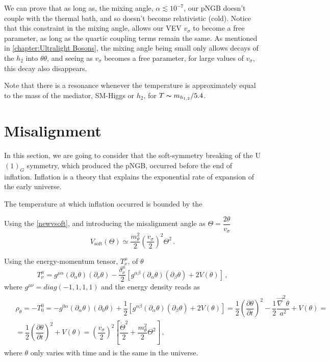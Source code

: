 We can prove that as long as, the mixing angle, $\alpha\lesssim10^{-7}$, our pNGB doesn't couple with the thermal bath, and so doesn't become relativistic (cold). Notice that this constraint in the mixing angle, allows our VEV $v_\sigma$ to become a free parameter, as long as the quartic coupling terms remain the same. As mentioned in \autoref{chapter:Ultralight Bosons}, the mixing angle being small only allows decays of the $h_2$ into $\theta\theta$, and seeing as $v_\sigma$ becomes a free parameter, for large values of $v_\sigma$, this decay also disappears.

Note that there is a resonance whenever the temperature is approximately equal to the mass of the mediator, SM-Higgs or $h_2$, for $T\thicksim m_{h_{1,2}}/5.4$\cite{kolb}.

\section{Misalignment}
 
In this section, we are going to consider that the soft-symmetry breaking of the U$(1)_G$ symmetry, which produced the pNGB, occurred before the end of inflation. Inflation is a theory that explains the exponential rate of expansion of the early universe.

The temperature at which inflation occurred is bounded by the 

Using the \autoref{newvsoft}, and introducing the misalignment angle as $\Theta = \dfrac{2\theta}{v_\sigma}$
\begin{equation}
    V_{\textrm{soft}}(\Theta)\simeq \frac{m_\theta^2}{2}\left(\frac{v_\sigma}{2}\right)^2\Theta^2\,.
\end{equation}

Using the energy-momentum tensor, $T^{\mu}_\nu$, of $\theta$ 
\begin{equation}
    T^\mu_\nu=g^{\mu\alpha}(\partial_\alpha\theta)(\partial_\nu\theta)-\frac{\delta^\mu_\nu}{2}[g^{\alpha\beta}(\partial_\alpha\theta)(\partial_\beta\theta)+2V(\theta)]\,,
\end{equation}
where $g^{\mu\nu}=diag(-1,1,1,1)$ and the energy density reads as \cite{Marsh_2016}\cite{kolb}
\begin{align}
\label{densityenergy}
\begin{array}{ccc}
    &\rho_\theta=-T^0_0=-g^{0\alpha}(\partial_\alpha\theta)(\partial_0\theta)+\dfrac{1}{2}[g^{\alpha\beta}(\partial_\alpha\theta)(\partial_\beta\theta)+2V(\theta)]=\dfrac{1}{2}\left(\dfrac{\partial\theta}{\partial t}\right)^2-\dfrac{1}{2}\dfrac{\vec{\nabla}^2\theta}{a^2}+V(\theta)=\\ [5pt]
    &=\dfrac{1}{2}\left(\dfrac{\partial\theta}{\partial t}\right)^2+V(\theta)=\left(\dfrac{v_\sigma}{2}\right)^2\left[\dfrac{\dot{\Theta}^2}{2}+\dfrac{m_\theta^2}{2}\Theta^2\right]\,,
\end{array}
\end{align}
where $\theta$ only varies with time and is the same in the universe.

